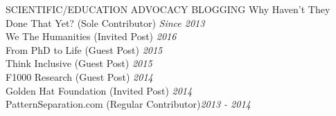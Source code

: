 \documentclass{resume} %
\begin{document}
\begin{rSection}{SCIENTIFIC/EDUCATION ADVOCACY BLOGGING}
	Why Haven't They Done That Yet? (Sole Contributor) \hfill {\em Since 2013}
	\\ We The Humanities (Invited Post) \hfill {\em 2016}
	\\ From PhD to Life (Guest Post) \hfill {\em 2015}
	\\ Think Inclusive (Guest Post) \hfill {\em 2015}
	\\ F1000 Research (Guest Post) \hfill {\em 2014}
	\\ Golden Hat Foundation (Invited Post) \hfill {\em 2014}
	\\ PatternSeparation.com (Regular Contributor)\hfill {\em 2013 - 2014}
\end{rSection}
\end{document}
